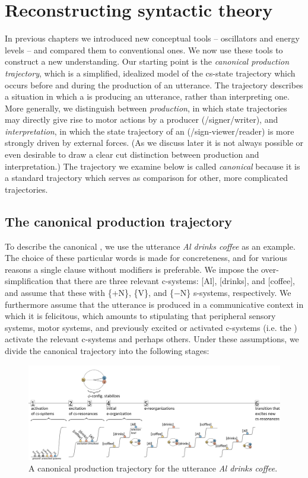 \chapter{Reconstructing syntactic theory}

In previous chapters we introduced new conceptual tools -- oscillators and energy levels -- and compared them to conventional ones. We now use these tools to construct a new understanding. Our starting point is the \textit{canonical production trajectory}, which is a simplified, idealized model of the cs-state trajectory which occurs before and during the production of an utterance. The trajectory describes a situation in which a  is producing an utterance, rather than interpreting one. More generally, we distinguish between \textit{production}, in which state trajectories may directly give rise to motor actions by a producer (/signer/writer), and \textit{interpretation}, in which the state trajectory of an  (/sign-viewer/reader) is more strongly driven by external forces. (As we discuss later it is not always possible or even desirable to draw a clear cut distinction between production and interpretation.) The trajectory we examine below is called \textit{canonical} because it is a standard trajectory which serves as comparison for other, more complicated trajectories.

\section{The canonical production trajectory}

To describe the canonical , we use the utterance \textit{Al drinks coffee} as an example. The choice of these particular words is made for concreteness, and for various reasons a single clause without modifiers is preferable. We impose the over-simplification that there are three relevant c-systems: [Al], [drinks], and [coffee], and assume that these  with \{+N\}, \{V\}, and \{−N\} s-systems, respectively. We furthermore assume that the utterance is produced in a communicative context in which it is felicitous, which amounts to stipulating that peripheral sensory systems, motor systems, and previously excited or activated c-systems (i.e. the ) activate the relevant c-systems and perhaps others. Under these assumptions, we divide the canonical trajectory into the following stages:

  
\begin{figure}
\includegraphics[width=\textwidth]{figures/Tilsen-img51.png}
\caption{A canonical production trajectory for the utterance \textit{Al drinks coffee}.}
\label{fig:4:1}
\end{figure}
 


